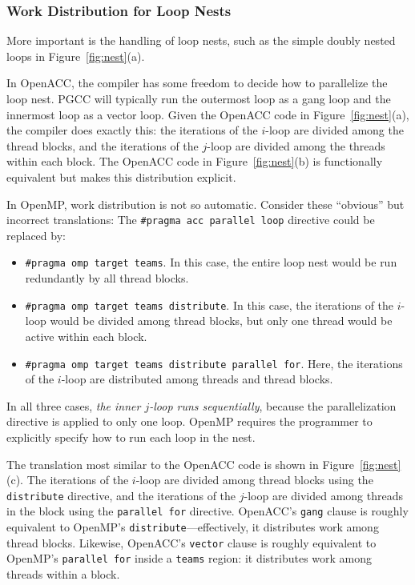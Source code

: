 \documentclass{sig-alternate-05-2015}
\newcommand{\squish}{
     { \setlength{\itemsep}{0pt}      \setlength{\parsep}{3pt}
       \setlength{\topsep}{3pt}       \setlength{\partopsep}{0pt}
       \setlength{\leftmargin}{1.5em} \setlength{\labelwidth}{1em}
       \setlength{\labelsep}{0.5em} } }
\begin{document}
\subsubsection{Work Distribution for Loop Nests}
\label{sec:nests}

More important is the handling of loop nests, such as the simple
doubly nested loops in Figure~\ref{fig:nest}(a).

In OpenACC, the compiler has some freedom to decide how to parallelize the loop
nest.  PGCC will typically run the outermost loop as a gang loop and the
innermost loop as a vector loop.  Given the OpenACC code in
Figure~\ref{fig:nest}(a), the compiler does exactly this: the iterations of the
$i$-loop are divided among the thread blocks, and the iterations of the
$j$-loop are divided among the threads within each block.  The OpenACC code in
Figure~\ref{fig:nest}(b) is functionally equivalent but makes this distribution
explicit.

In OpenMP, work distribution is not so automatic.  Consider these ``obvious''
but incorrect translations: The \texttt{\#pragma acc parallel loop} directive
could be replaced by:
\begin{itemize}\squish
\item \texttt{\#pragma omp target teams}.  In this case, the entire loop
nest would be run redundantly by all thread blocks.
\item \texttt{\#pragma omp target teams distribute}.  In this case, the
iterations of the $i$-loop would be divided among thread blocks, but only
one thread would be active within each block.
\item \texttt{\#pragma omp target teams distribute parallel for}.  Here,
the iterations of the $i$-loop are distributed among threads and thread blocks.
\end{itemize}
In all three cases, \emph{the inner $j$-loop runs sequentially}, because the
parallelization directive is applied to only one loop.  OpenMP requires the
programmer to explicitly specify how to run each loop in the nest.

The translation most similar to the OpenACC code is shown in
Figure~\ref{fig:nest}(c).  The iterations of the $i$-loop are divided among
thread blocks using the \texttt{distribute} directive, and the iterations of
the $j$-loop are divided among threads in the block using the \texttt{parallel
for} directive.
%
OpenACC's \texttt{gang} clause is roughly equivalent to OpenMP's
\texttt{distribute}---effectively, it distributes work among thread blocks.
Likewise, OpenACC's \texttt{vector} clause is roughly equivalent to OpenMP's
\texttt{parallel for} inside a \texttt{teams} region: it distributes work among
threads within a block.
\end{document}

